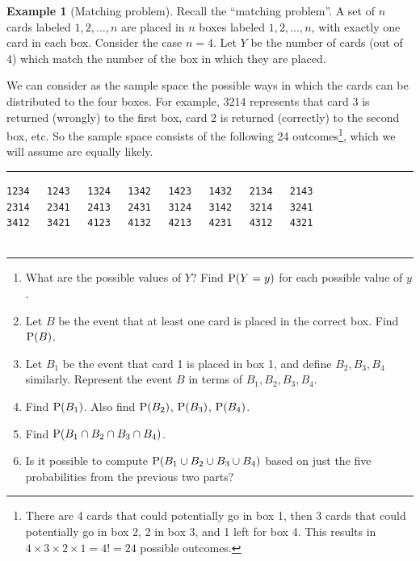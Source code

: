 \documentclass[
]{book}
\providecommand{\tightlist}{%
  \setlength{\itemsep}{0pt}\setlength{\parskip}{0pt}}
\theoremstyle{definition}
\theoremstyle{definition}
\newtheorem{example}{Example}[chapter]
\theoremstyle{definition}
\theoremstyle{remark}
\begin{document}
\begin{example}[Matching problem]
\protect\hypertarget{exm:matching-probspace}{}{\label{exm:matching-probspace} {} }Recall the ``matching problem''.
A set of \(n\) cards labeled \(1, 2, \ldots, n\) are placed in \(n\)
boxes labeled \(1, 2, \ldots, n\), with exactly one card in each box.
Consider the case \(n=4\). Let
\(Y\) be the number of cards (out of 4) which match the number of the
box in which they are placed.

We can consider as the sample space the possible ways in which the cards can be distributed to the four boxes. For example, 3214 represents that card 3 is returned (wrongly) to the first box, card 2 is returned (correctly) to the second box, etc. So the sample space consists of the following 24 outcomes\footnote{There are 4 cards that could potentially go in box 1, then 3 cards that could potentially go in box 2, 2 in box 3, and 1 left for box 4. This results in \(4\times3\times2\times1=4! = 24\) possible outcomes.}, which we will assume are equally likely.

\begin{center}\rule{0.5\linewidth}{0.5pt}\end{center}

\begin{verbatim}
1234   1243   1324   1342   1423   1432   2134   2143
2314   2341   2413   2431   3124   3142   3214   3241
3412   3421   4123   4132   4213   4231   4312   4321
                                               
\end{verbatim}

\begin{center}\rule{0.5\linewidth}{0.5pt}\end{center}
\end{example}

\begin{enumerate}
\def\labelenumi{\arabic{enumi}.}
\tightlist
\item
  What are the possible values of \(Y\)? Find \(\textrm{P}(Y=y)\) for each possible value of \(y\).
\item
  Let \(B\) be the event that at least one card is placed in the correct box. Find \(\textrm{P}(B)\).
\item
  Let \(B_1\) be the event that card 1 is placed in box 1, and define \(B_2, B_3, B_4\) similarly. Represent the event \(B\) in terms of \(B_1, B_2, B_3, B_4\).
\item
  Find \(\textrm{P}(B_1)\). Also find \(\textrm{P}(B_2)\), \(\textrm{P}(B_3)\), \(\textrm{P}(B_4)\).
\item
  Find \(\textrm{P}(B_1\cap B_2 \cap B_3 \cap B_4)\).
\item
  Is it possible to compute \(\textrm{P}(B_1 \cup B_2 \cup B_3 \cup B_4)\) based on just the five probabilities from the previous two parts?
\end{enumerate}
\end{document}
